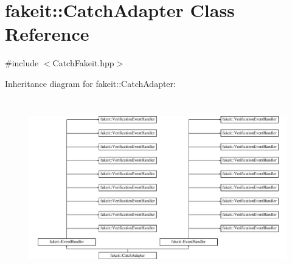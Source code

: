 \hypertarget{classfakeit_1_1CatchAdapter}{}\section{fakeit\+::Catch\+Adapter Class Reference}
\label{classfakeit_1_1CatchAdapter}


{\ttfamily \#include $<$Catch\+Fakeit.\+hpp$>$}

Inheritance diagram for fakeit\+::Catch\+Adapter\+:\begin{figure}[H]
\begin{center}
\leavevmode
\includegraphics[height=7.777778cm]{classfakeit_1_1CatchAdapter}
\end{center}
\end{figure}
